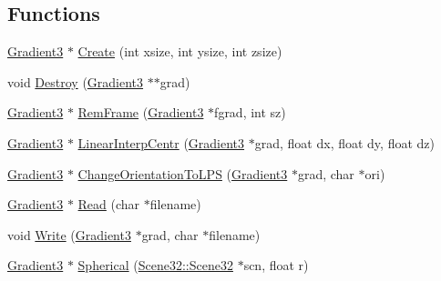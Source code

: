 \subsection*{Functions}
\begin{DoxyCompactItemize}
\item 
\hyperlink{namespacegft_1_1Gradient3_acc3ba84d5f1e1fd680f64f29da6ac0eb}{Gradient3} $\ast$ \hyperlink{namespacegft_1_1Gradient3_a61f6e9df32547af3da6ce4dfd3e01ad9}{Create} (int xsize, int ysize, int zsize)
\item 
void \hyperlink{namespacegft_1_1Gradient3_adb7ad6c7e70ad03cf83607f620003466}{Destroy} (\hyperlink{namespacegft_1_1Gradient3_acc3ba84d5f1e1fd680f64f29da6ac0eb}{Gradient3} $\ast$$\ast$grad)
\item 
\hyperlink{namespacegft_1_1Gradient3_acc3ba84d5f1e1fd680f64f29da6ac0eb}{Gradient3} $\ast$ \hyperlink{namespacegft_1_1Gradient3_a8e212461b77183941afaf85345435797}{Rem\-Frame} (\hyperlink{namespacegft_1_1Gradient3_acc3ba84d5f1e1fd680f64f29da6ac0eb}{Gradient3} $\ast$fgrad, int sz)
\item 
\hyperlink{namespacegft_1_1Gradient3_acc3ba84d5f1e1fd680f64f29da6ac0eb}{Gradient3} $\ast$ \hyperlink{namespacegft_1_1Gradient3_a7914ac2b28a9a33c262dbad2b3487ae6}{Linear\-Interp\-Centr} (\hyperlink{namespacegft_1_1Gradient3_acc3ba84d5f1e1fd680f64f29da6ac0eb}{Gradient3} $\ast$grad, float dx, float dy, float dz)
\item 
\hyperlink{namespacegft_1_1Gradient3_acc3ba84d5f1e1fd680f64f29da6ac0eb}{Gradient3} $\ast$ \hyperlink{namespacegft_1_1Gradient3_ab622e61330a63d7c0bfa0b3ba46c19dd}{Change\-Orientation\-To\-L\-P\-S} (\hyperlink{namespacegft_1_1Gradient3_acc3ba84d5f1e1fd680f64f29da6ac0eb}{Gradient3} $\ast$grad, char $\ast$ori)
\item 
\hyperlink{namespacegft_1_1Gradient3_acc3ba84d5f1e1fd680f64f29da6ac0eb}{Gradient3} $\ast$ \hyperlink{namespacegft_1_1Gradient3_ab4fd94ba70f776f2ae1e9b9e173c46b0}{Read} (char $\ast$filename)
\item 
void \hyperlink{namespacegft_1_1Gradient3_a3385f906892c7daf8c89362ce5aadd00}{Write} (\hyperlink{namespacegft_1_1Gradient3_acc3ba84d5f1e1fd680f64f29da6ac0eb}{Gradient3} $\ast$grad, char $\ast$filename)
\item 
\hyperlink{namespacegft_1_1Gradient3_acc3ba84d5f1e1fd680f64f29da6ac0eb}{Gradient3} $\ast$ \hyperlink{namespacegft_1_1Gradient3_ae51c9c870994011f339ea9a21f556cc9}{Spherical} (\hyperlink{namespacegft_1_1Scene32_ae492ac529c9149889605a7bebd647c46}{Scene32\-::\-Scene32} $\ast$scn, float r)
\item 
$$
\end{DoxyCompactItemize}
